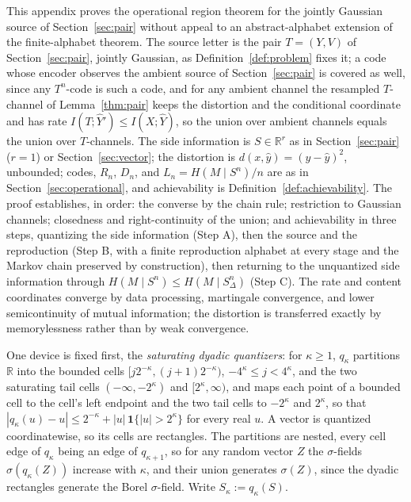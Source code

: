 \documentclass[11pt,onecolumn]{IEEEtran}
\newcommand{\R}{\mathbb{R}}
\newcommand{\hY}{\widehat{Y}}
\begin{document}
This appendix proves the operational region theorem for the jointly
Gaussian source of Section~\ref{sec:pair} without appeal to an
abstract-alphabet extension of the finite-alphabet theorem. The source letter
is the pair $T=(Y,V)$ of Section~\ref{sec:pair}, jointly Gaussian, as
Definition~\ref{def:problem} fixes it; a code whose encoder observes the
ambient source of Section~\ref{sec:pair} is covered as well, since any
$T^n$-code is such a code, and for any ambient channel the resampled
$T$-channel of Lemma~\ref{thm:pair} keeps the distortion and the
conditional coordinate and has rate $I(T;\hY')\le I(X;\hY)$, so the union
over ambient channels equals the union over $T$-channels. The
side information is $S\in\R^r$ as in
Section~\ref{sec:pair} ($r=1$) or Section~\ref{sec:vector}; the
distortion is
$d(x,\hat y)=(y-\hat y)^2$, unbounded; codes, $R_n$, $D_n$, and
$L_n=H(M\mid S^n)/n$ are as in Section~\ref{sec:operational}, and
achievability is Definition~\ref{def:achievability}. The proof
establishes, in order: the converse by the chain rule; restriction to
Gaussian channels; closedness and right-continuity of the union; and
achievability in three steps, quantizing the side information
(Step A), then the source and the reproduction (Step B, with a finite
reproduction alphabet at every stage and the Markov chain preserved by
construction), then returning to the unquantized side information through
$H(M\mid S^n)\le H(M\mid S_\Delta^n)$ (Step C). The rate and content
coordinates converge by data processing, martingale convergence, and
lower semicontinuity of mutual information; the distortion is
transferred exactly by memorylessness rather than by weak convergence.

One device is fixed first, the \emph{saturating dyadic quantizers}:
for $\kappa\ge1$, $q_\kappa$ partitions $\R$ into the bounded cells
$[j2^{-\kappa},(j+1)2^{-\kappa})$, $-4^\kappa\le j<4^\kappa$, and the two saturating tail
cells $(-\infty,-2^\kappa)$ and $[2^\kappa,\infty)$, and maps each point of a
bounded cell to the cell's left endpoint and the two tail cells to
$-2^\kappa$ and $2^\kappa$, so that $|q_\kappa(u)-u|\le2^{-\kappa}+|u|\,\mathbf 1\{|u|>2^\kappa\}$
for every real $u$. A vector is quantized coordinatewise, so its cells
are rectangles. The partitions are nested, every cell edge of $q_\kappa$
being an edge of $q_{\kappa+1}$, so for any random vector $Z$ the
$\sigma$-fields $\sigma(q_\kappa(Z))$ increase with $\kappa$, and their union
generates $\sigma(Z)$, since the dyadic rectangles generate the Borel
$\sigma$-field. Write $S_\kappa:=q_\kappa(S)$.
\end{document}
